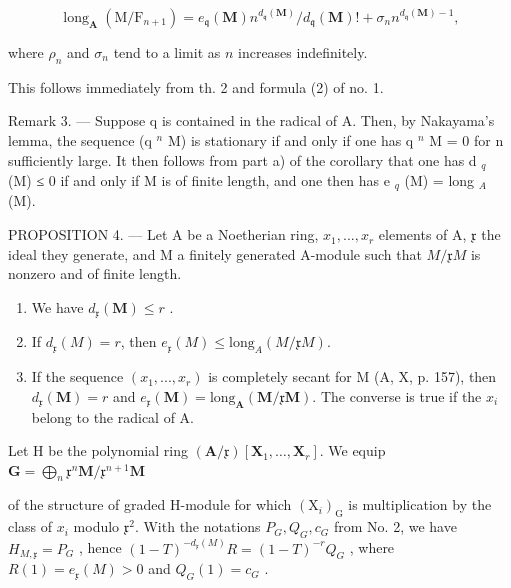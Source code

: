 \[
\operatorname{long} _ {\mathbf {A}} (\mathrm{M} / \mathrm{F} _ {n + 1}) = e _ {\mathfrak {q}} (\mathbf {M}) n ^ {d _ {\mathfrak {q}} (\mathbf {M})} / d _ {\mathfrak {q}} (\mathbf {M})! + \sigma_ {n} n ^ {d _ {\mathfrak {q}} (\mathbf {M}) - 1},
\]

where \(\rho_{n}\) and \(\sigma_{n}\) tend to a limit as \(n\) increases indefinitely.

This follows immediately from th. 2 and formula (2) of no. 1.

Remark 3. --- Suppose q is contained in the radical of A. Then, by Nakayama's lemma, the sequence (q \(^{n}\) M) is stationary if and only if one has q \(^{n}\) M = 0 for n sufficiently large. It then follows from part a) of the corollary that one has d \(_{q}\) (M) ≤ 0 if and only if M is of finite length, and one then has e \(_{q}\) (M) = long \(_{A}\) (M).

PROPOSITION 4. — Let A be a Noetherian ring, \(x_{1},...,x_{r}\) elements of A, \(\mathfrak{x}\) the ideal they generate, and M a finitely generated A-module such that \(M/\mathfrak{x}M\) is nonzero and of finite length.

\begin{enumerate}
\def\labelenumi{\alph{enumi})}
\item
  We have \(d_{\mathfrak{x}}(\mathbf{M}) \leqslant r\) .
\item
  If \(d_{\mathfrak{x}}(M) = r\), then \(e_{\mathfrak{x}}(M) \leqslant \text{long}_{A}(M/\mathfrak{x}M)\).
\item
  If the sequence \((x_{1},...,x_{r})\) is completely secant for M (A, X, p. 157), then \(d_{\mathfrak{x}}(\mathbf{M}) = r\) and \(e_{\mathfrak{x}}(\mathbf{M}) = \text{long}_{\mathbf{A}}(\mathbf{M}/\mathfrak{x}\mathbf{M})\). The converse is true if the \(x_{i}\) belong to the radical of A.
\end{enumerate}

Let H be the polynomial ring \((\mathbf{A} / \mathfrak{x})[\mathbf{X}_1,\dots ,\mathbf{X}_r]\). We equip \(\mathbf{G} = \bigoplus_{n}\mathfrak{x}^{n}\mathbf{M} / \mathfrak{x}^{n + 1}\mathbf{M}\)

of the structure of graded H-module for which \((\mathrm{X}_{i})_{\mathrm{G}}\) is multiplication by the class of \(x_{i}\) modulo \(\mathfrak{x}^{2}\). With the notations \(P_{G}, Q_{G}, c_{G}\) from No. 2, we have \(H_{M,\mathfrak{x}} = P_{G}\) , hence \((1 - T)^{-d_{\mathfrak{x}}(M)}R = (1 - T)^{-r}Q_{G}\) , where \(R(1) = e_{\mathfrak{x}}(M) > 0\) and \(Q_{G}(1) = c_{G}\) .


